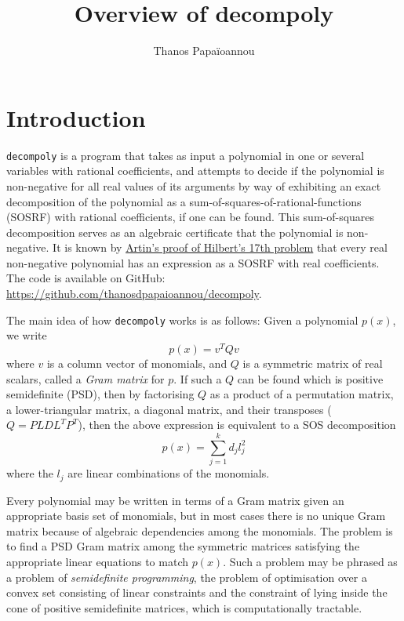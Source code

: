 \documentclass[oneside, 10pt]{amsart}
\title{\Large Overview of decompoly}
\author{Thanos Papa\"ioannou}
\begin{document}
    \maketitle

    \section{Introduction}
    \texttt{decompoly} is a program that takes as input a polynomial in one or several variables with rational coefficients, and attempts to decide if the polynomial is non-negative for all real values of its arguments by way of exhibiting an exact decomposition of the polynomial as a sum-of-squares-of-rational-functions (SOSRF) with rational coefficients, if one can be found. This sum-of-squares decomposition serves as an algebraic certificate that the polynomial is non-negative. It is known by \href{https://link.springer.com/article/10.1007\%2FBF02952513}{Artin's proof of Hilbert's 17th problem} that every real non-negative polynomial has an expression as a SOSRF with real coefficients. The code is available on GitHub: \href{https://github.com/thanosdpapaioannou/decompoly}{https://github.com/thanosdpapaioannou/decompoly}.

    The main idea of how  \texttt{decompoly} works is as follows: Given a polynomial $p(x)$, we write
    \begin{equation}
        p(x) = v^T Q v
    \end{equation}
    where $v$ is a column vector of monomials, and $Q$ is a symmetric matrix of real scalars, called a \emph{Gram matrix} for $p$. If such a $Q$ can be found which is positive semidefinite (PSD), then by factorising $Q$ as a product of a permutation matrix, a lower-triangular matrix, a diagonal matrix, and their transposes ($Q = PLDL^T P^T$), then the above expression is equivalent to a SOS decomposition
    \begin{equation}
        p(x) = \sum_{j=1}^k d_j l_j^2
    \end{equation}
    where the $l_j$ are linear combinations of the monomials.

    Every polynomial may be written in terms of a Gram matrix given an appropriate basis set of monomials, but in most cases there is no unique Gram matrix because of algebraic dependencies among the monomials. The problem is to find a PSD Gram matrix among the symmetric matrices satisfying the appropriate linear equations to match $p(x)$. Such a problem may be phrased as a problem of \emph{semidefinite programming}, the problem of optimisation over a convex set consisting of linear constraints and the constraint of lying inside the cone of positive semidefinite matrices, which is computationally tractable.
\end{document}

